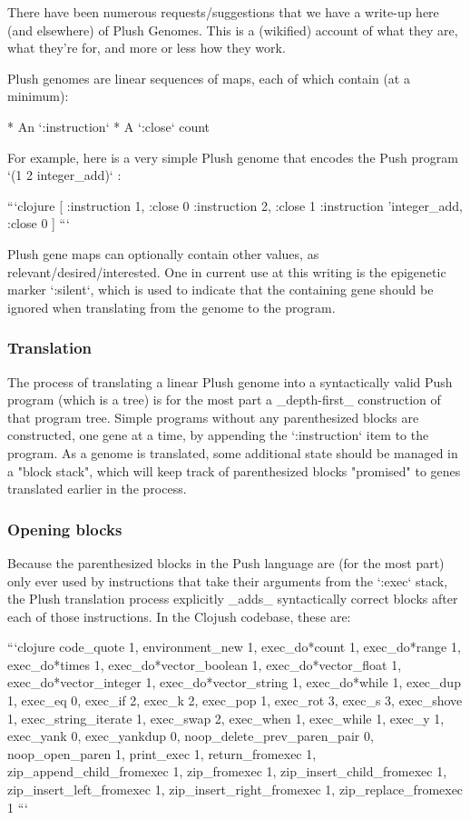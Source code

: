 There have been numerous requests/suggestions that we have a write-up here (and elsewhere) of Plush Genomes. This is a (wikified) account of what they are, what they're for, and more or less how they work.

Plush genomes are linear sequences of maps, each of which contain (at a minimum):

* An `:instruction`
* A `:close` count

For example, here is a very simple Plush genome that encodes the Push program `(1 2 integer\_add)` :

```clojure
[ {:instruction 1, :close 0}
  {:instruction 2, :close 1}
  {:instruction 'integer\_add, :close 0} ]
```

Plush gene maps can optionally contain other values, as relevant/desired/interested. One in current use at this writing is the epigenetic marker `:silent`, which is used to indicate that the containing gene should be ignored when translating from the genome to the program.

\subsubsection{ Translation}

The process of translating a linear Plush genome into a syntactically valid Push program (which is a tree) is for the most part a \_depth-first\_ construction of that program tree. Simple programs without any parenthesized blocks are constructed, one gene at a time, by appending the `:instruction` item to the program. As a genome is translated, some additional state should be managed in a "block stack", which will keep track of parenthesized blocks "promised" to genes translated earlier in the process.

\subsubsection{ Opening blocks}

Because the parenthesized blocks in the Push language are (for the most part) only ever used by instructions that take their arguments from the `:exec` stack, the Plush translation process explicitly \_adds\_ syntactically correct blocks after each of those instructions. In the Clojush codebase, these are:

```clojure
    {code\_quote 1,
     environment\_new 1,
     exec\_do*count 1,
     exec\_do*range 1,
     exec\_do*times 1,
     exec\_do*vector\_boolean 1,
     exec\_do*vector\_float 1,
     exec\_do*vector\_integer 1,
     exec\_do*vector\_string 1,
     exec\_do*while 1,
     exec\_dup 1,
     exec\_eq 0,
     exec\_if 2,
     exec\_k 2,
     exec\_pop 1,
     exec\_rot 3,
     exec\_s 3,
     exec\_shove 1,
     exec\_string\_iterate 1,
     exec\_swap 2,
     exec\_when 1,
     exec\_while 1,
     exec\_y 1,
     exec\_yank 0,
     exec\_yankdup 0,
     noop\_delete\_prev\_paren\_pair 0,
     noop\_open\_paren 1,
     print\_exec 1,
     return\_fromexec 1,
     zip\_append\_child\_fromexec 1,
     zip\_fromexec 1,
     zip\_insert\_child\_fromexec 1,
     zip\_insert\_left\_fromexec 1,
     zip\_insert\_right\_fromexec 1,
     zip\_replace\_fromexec 1}
```

